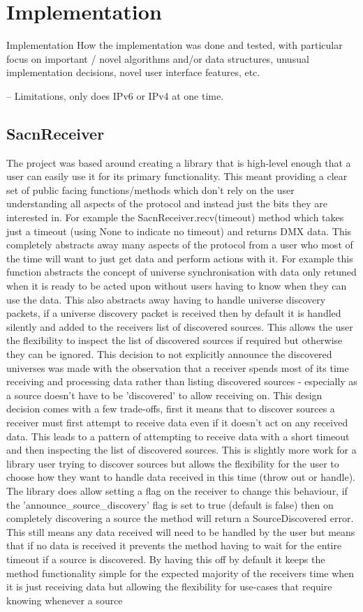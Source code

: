 \documentclass[11pt,a4paper]{report}
\begin{document}
\section{Implementation}
Implementation
How the implementation was done and tested, with particular focus on important / novel algorithms and/or data structures, unusual implementation decisions, novel user interface features, etc.

-- Limitations, only does IPv6 or IPv4 at one time.


\subsection{SacnReceiver}
The project was based around creating a library that is high-level enough that a user can easily use it for its primary functionality. This meant providing a clear set of public facing functions/methods which don't rely on the user understanding all aspects of the protocol and instead just the bits they are interested in. For example the SacnReceiver.recv(timeout) method which takes just a timeout (using None to indicate no timeout) and returns DMX data. This completely abstracts away many aspects of the protocol from a user who most of the time will want to just get data and perform actions with it. For example this function abstracts the concept of universe synchronisation with data only retuned when it is ready to be acted upon without users having to know when they can use the data. This also abstracts away having to handle universe discovery packets, if a universe discovery packet is received then by default it is handled silently and added to the receivers list of discovered sources. This allows the user the flexibility to inspect the list of discovered sources if required but otherwise they can be ignored. This decision to not explicitly announce the discovered universes was made with the observation that a receiver spends most of its time receiving and processing data rather than listing discovered sources - especially as a source doesn't have to be 'discovered' to allow receiving on. This design decision comes with a few trade-offs, first it means that to discover sources a receiver must first attempt to receive data even if it doesn't act on any received data. This leads to a pattern of attempting to receive data with a short timeout and then inspecting the list of discovered sources. This is slightly more work for a library user trying to discover sources but allows the flexibility for the user to choose how they want to handle data received in this time (throw out or handle). The library does allow setting a flag on the receiver to change this behaviour, if the 'announce\_source\_discovery' flag is set to true (default is false) then on completely discovering a source the method will return a SourceDiscovered error. This still means any data received will need to be handled by the user but means that if no data is received it prevents the method having to wait for the entire timeout if a source is discovered. By having this off by default it keeps the method functionality simple for the expected majority of the receivers time when it is just receiving data but allowing the flexibility for use-cases that require knowing whenever a source 
\end{document}
